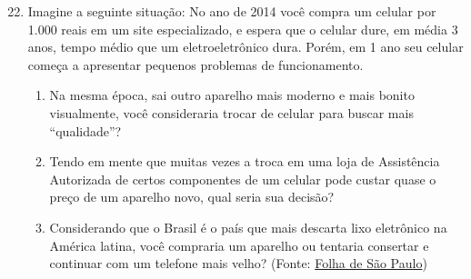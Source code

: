 \begin{enumerate}\setcounter{enumi}{21}

\item Imagine a seguinte situação: No ano de 2014 você compra um celular por 1.000 reais em um site especializado, e espera que o celular dure, em média 3 anos, tempo médio que um eletroeletrônico dura. Porém, em 1 ano seu celular começa a apresentar pequenos problemas de funcionamento. 
  \begin{enumerate}
  \item Na mesma época, sai outro aparelho mais moderno e mais bonito visualmente, você consideraria trocar de celular para buscar mais “qualidade”?

  \item Tendo em mente que muitas vezes a troca em uma loja de Assistência Autorizada de certos componentes de um celular pode custar quase o preço de um aparelho novo, qual seria sua decisão?

  \item Considerando que o Brasil é o país que mais descarta lixo eletrônico na América latina, você compraria um aparelho ou tentaria consertar e continuar com um telefone mais velho? (Fonte: \href{http://www1.folha.uol.com.br/ambiente/2017/04/1879303-mundo-produzira-50-milhoes-de-toneladas-de-lixo-eletronico-em-2017.shtml}{Folha de São Paulo})
  \end{enumerate}
\end{enumerate}
\clearpage

